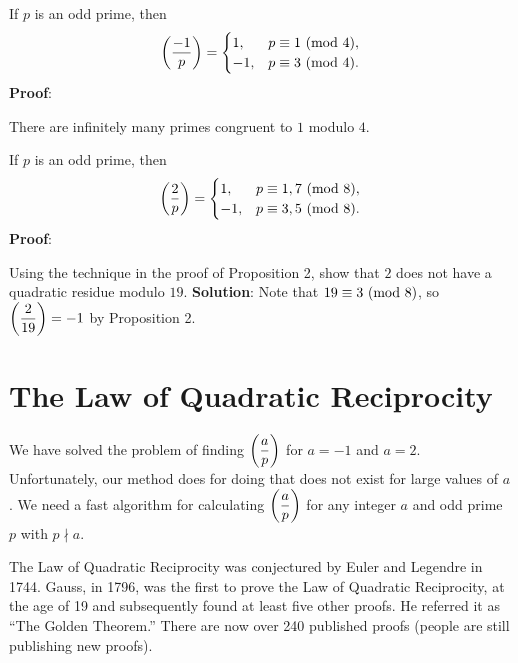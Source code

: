 \begin{Corollary}{}{}
    If $ p $ is an odd prime, then
    \[ \biggl(\dfrac{-1}{p}\biggr)=\begin{cases}
            1,  & p\equiv 1\ (\mathrm{mod}\ 4), \\
            -1, & p\equiv 3\ (\mathrm{mod}\ 4).
        \end{cases} \]
    \tcblower{}
    \textbf{Proof}:
\end{Corollary}
\begin{Proposition}{}{}
    There are infinitely many primes congruent to $ 1 $ modulo $ 4 $.
\end{Proposition}
\begin{Proposition}{}{}
    If $ p $ is an odd prime, then
    \[ \biggl(\dfrac{2}{p}\biggr)=\begin{cases}
            1,  & p\equiv 1,7\ (\mathrm{mod}\ 8), \\
            -1, & p\equiv 3,5\ (\mathrm{mod}\ 8).
        \end{cases} \]
    \tcblower{}
    \textbf{Proof}:
\end{Proposition}
\begin{Exercise}{}{}
    Using the technique in the proof of Proposition 2, show that $2$ does not have a
    quadratic residue modulo $19$.
    \tcblower{}
    \textbf{Solution}: Note that $ 19\equiv 3\ (\mathrm{mod}\ 8) $, so
    $ \biggl(\dfrac{2}{19}\biggr)=-1 $
    by Proposition 2.
\end{Exercise}

\section{The Law of Quadratic Reciprocity}
We have solved the problem of finding $ \biggl(\dfrac{a}{p}\biggr) $ for $ a=-1 $ and $ a=2 $.
Unfortunately, our method does for doing that does not exist for large values of $ a $.
We need a fast algorithm for calculating $ \biggl(\dfrac{a}{p}\biggr) $ for any integer $ a $
and odd prime $ p $ with $ p\nmid a $.

The Law of Quadratic Reciprocity was conjectured by Euler and Legendre in
1744. Gauss, in 1796, was the first to prove the Law of Quadratic Reciprocity, at
the age of 19 and subsequently found at least five other proofs. He referred it as
``The Golden Theorem.'' There are now over 240 published proofs (people are still
publishing new proofs).

